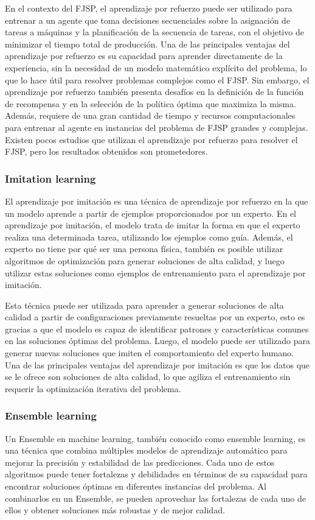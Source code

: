 En el contexto del FJSP, el aprendizaje por refuerzo puede ser utilizado para entrenar a un 
agente que toma decisiones secuenciales sobre la asignación de tareas a máquinas y la 
planificación de la secuencia de tareas, con el objetivo de minimizar el tiempo total de producción. 
Una de las principales ventajas del aprendizaje por refuerzo es su capacidad para aprender directamente 
de la experiencia, sin la necesidad de un modelo matemático explícito del problema, lo que lo hace 
útil para resolver problemas complejos como el FJSP. Sin embargo, el aprendizaje 
por refuerzo también presenta desafíos en la definición de la función de recompensa y en la 
selección de la política óptima que maximiza la misma. Además, requiere de una gran cantidad de tiempo 
y recursos computacionales para entrenar al agente en instancias del problema de FJSP grandes y complejas.
Existen pocos estudios que utilizan el aprendizaje por refuerzo para resolver el FJSP, pero los resultados
obtenidos son prometedores.

\subsubsection{Imitation learning}
El aprendizaje por imitación es una técnica de aprendizaje por refuerzo en la que un modelo aprende
a partir de ejemplos proporcionados por un experto. En el aprendizaje por imitación, el modelo trata
de imitar la forma en que el experto realiza una determinada tarea, utilizando los ejemplos como guía.
Además, el experto no tiene por qué ser una persona física, también es posible utilizar algoritmos de
optimización para generar soluciones de alta calidad, y luego utilizar estas soluciones como ejemplos
de entrenamiento para el aprendizaje por imitación.\medskip

Esta técnica puede ser utilizada para aprender a generar soluciones de alta calidad a partir de 
configuraciones previamente resueltas por un experto, esto es gracias a que el modelo es capaz de 
identificar patrones y características comunes en las soluciones óptimas del problema. Luego, el 
modelo puede ser utilizado para generar nuevas soluciones que imiten el comportamiento del experto 
humano. Una de las principales ventajas del aprendizaje por imitación es que los datos que se le 
ofrece son soluciones de alta calidad, lo que agiliza el entrenamiento sin requerir la optimización 
iterativa del problema. 

\subsubsection{Ensemble learning}
Un Ensemble en machine learning, también conocido como ensemble learning, es una técnica que 
combina múltiples modelos de aprendizaje automático para mejorar la precisión y estabilidad de 
las predicciones. Cada uno de estos algoritmos puede tener fortalezas y debilidades en términos 
de su capacidad para encontrar soluciones óptimas en diferentes instancias del problema. Al 
combinarlos en un Ensemble, se pueden aprovechar las fortalezas de cada uno de ellos y obtener
soluciones más robustas y de mejor calidad.\medskip


